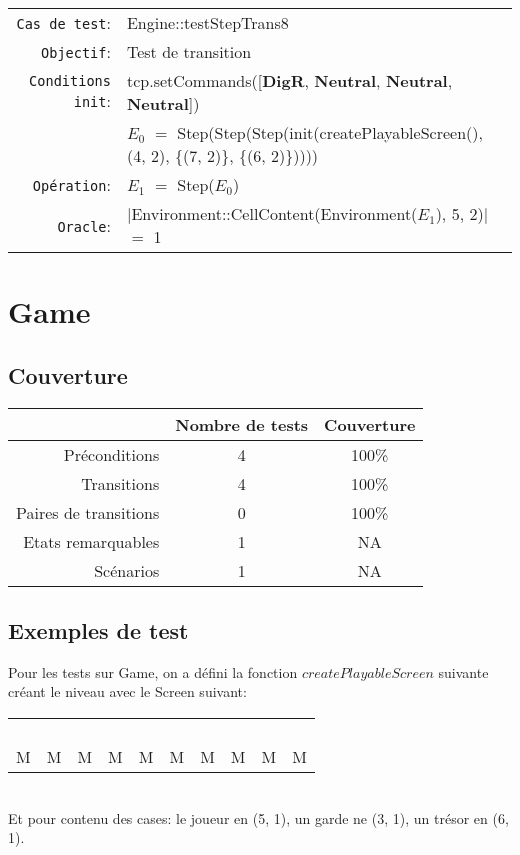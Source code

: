 \documentclass{article}
\begin{document}
{\small
  \begin{longtable}{rl}
    \texttt{Cas de test}: &\textrm{Engine::testStepTrans8}\\
    \texttt{Objectif}: & Test de transition \\
    \texttt{Conditions init}: & \textrm{tcp.setCommands([\textbf{DigR}, \textbf{Neutral}, \textbf{Neutral}, \textbf{Neutral}])}\\
    & $E_0$ $=$ \textrm{Step(Step(Step(init(createPlayableScreen(), (4, 2), \{(7, 2)\}, \{(6, 2)\}))))}\\
    \texttt{Opération}: &$E_1$ $=$ \textrm{Step($E_0$)}\\
    \texttt{Oracle}: &\textrm{$|$Environment::CellContent(Environment($E_1$), 5, 2)$|$} $=$ 1\\
  \end{longtable}}

\section{Game}

\subsection{Couverture}

\begin{longtable}{r|cc}
  &Nombre de tests&Couverture\\
  \hline
  Préconditions & 4 & 100\%\\
  Transitions & 4& 100\%\\
  Paires de transitions & 0 & 100\%\\
  Etats remarquables & 1 & NA\\
  Scénarios & 1 & NA\\
\end{longtable}

\subsection{Exemples de test}

Pour les tests sur Game, on a défini la fonction $createPlayableScreen$ suivante créant le niveau avec le Screen suivant:\\
\begin{tabular}{cccccccccc}
   & & & & & & & & & \\
   & & & & & & & & & \\
   & & & & & & & & & \\
   & & & & & & & & &\\
  M&M&M&M&M&M&M&M&M&M
\end{tabular}\\
\noindent Et pour contenu des cases: le joueur en (5, 1), un garde ne (3, 1), un trésor en (6, 1).
\end{document}
